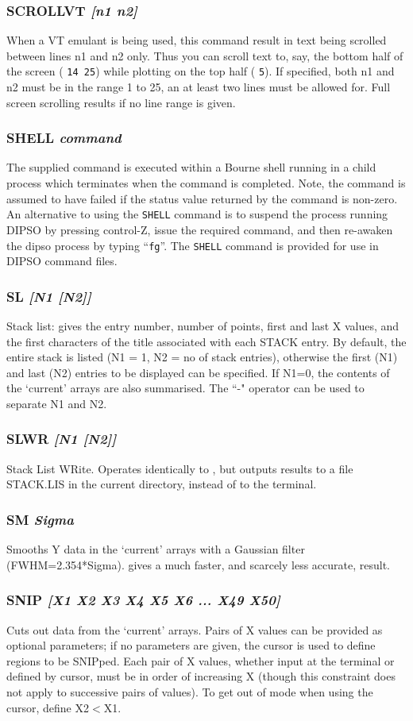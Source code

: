 \documentclass[twoside,11pt,noabs,nolof]{starlink}
\providecommand{\dipcom}[3]{\subsubsection*{\label{COM:#1}\textbf{#1} \emph{#2}}}
\begin{document}
\dipcom{SCROLLVT}{[n1 n2]}{Causes text to be scrolled between specified lines}
When a VT emulant is being used, this command result in text being
scrolled between lines n1 and n2 only. Thus you can scroll text to,
say, the bottom half of the screen
( \texttt{14 25}) while plotting on
the top half ( \texttt{5}). If specified, both n1 and n2 must be in the
range 1 to 25, an at least two lines must be allowed for. Full screen
scrolling results if no line range is given.

\dipcom{SHELL}{command}{Executes a shell command}
The supplied command is executed within a Bourne shell running in a child
process which terminates when the command is completed. Note, the command
is assumed to have failed if the status value returned by the command is
non-zero. An alternative to using the \texttt{SHELL} command is to suspend
the process running DIPSO by pressing control-Z, issue the required
command, and then re-awaken the dipso process by typing ``\texttt{fg}''. The
\texttt{SHELL} command is provided for use in DIPSO command files.

\dipcom{SL}{[N1 [N2]]}{Lists the contents of the stack and current arrays}
Stack list: gives the entry number, number of points, first and last X
values, and the first characters of the title associated with each
STACK entry. By default, the entire stack is listed (N1 = 1, N2 = no
of stack entries), otherwise the first (N1) and last (N2) entries to
be displayed can be specified. If N1=0, the contents of the `current'
arrays are also summarised. The ``-" operator can be used to separate
N1 and N2.

\dipcom{SLWR}{[N1 [N2]]}{As {\texttt{SL}},  but writes the information to a text file}
Stack List WRite. Operates identically to ,  but outputs results to a
file STACK.LIS in the current directory, instead of to the terminal.

\dipcom{SM}{Sigma}{Applies Gaussian smoothing to an array}
Smooths Y data in the `current' arrays with a Gaussian filter
(FWHM=2.354*Sigma).   gives a much faster, and scarcely less
accurate, result.

\dipcom{SNIP}{[X1 X2 X3 X4 X5 X6 ... X49 X50]}{Cuts out data from the current arrays}
Cuts out data from the `current' arrays. Pairs of X values can be
provided as optional parameters; if no parameters are given, the
cursor is used to define regions to be SNIPped. Each pair of X values,
whether input at the terminal or defined by cursor, must be in order
of increasing X (though this constraint does not apply to successive
pairs of values). To get out of   mode when using the cursor,
define X2$<$X1.
\end{document}
